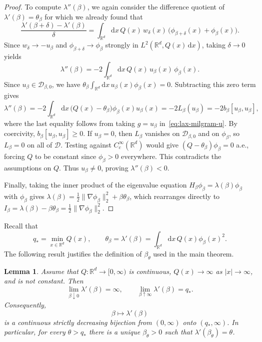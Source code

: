 \documentclass[11pt,reqno]{amsart}
\newtheorem{lemma}[theorem]{Lemma}
\theoremstyle{definition}
\numberwithin{equation}{section}
\newcommand{\<}{\langle}
\renewcommand{\>}{\rangle}
\def\de{{\rm d}}
\def\de{{\mathrm {d}}}
\begin{document}
\begin{appendix}
\begin{proof}
To compute $\lambda''(\beta)$, we again consider the difference quotient of $\lambda'(\beta) = \theta_{\beta}$ for which we already found that
\[
\frac{\lambda'(\beta+\delta) - \lambda'(\beta)}{\delta} = \int_{\mathbb{R}^d} \de x \, Q(x) \, w_{\delta}(x) \, \big(\phi_{\beta+\delta}(x) + \phi_{\beta}(x) \big).
\]
Since $w_{\delta} \to -u_{\beta}$ and $\phi_{\beta+\delta} \to \phi_{\beta}$ strongly in $L^2(\mathbb{R}^d,Q(x)\,\de x)$, taking $\delta \to 0$ yields
\[
\lambda''(\beta) = -2 \int_{\mathbb{R}^d} \de x \, Q(x) \, u_{\beta}(x) \, \phi_{\beta}(x) .
\]
Since $u_{\beta} \in \mathcal{D}_{\beta,0}$, we have $\theta_{\beta} \int_{\mathbb{R}^d} \de x \, u_{\beta}(x)\phi_{\beta}(x) = 0$. Subtracting this zero term gives
\[
\lambda''(\beta) = -2 \int_{\mathbb{R}^d} \de x \, \big(Q(x) - \theta_{\beta}\big)\phi_{\beta}(x) u_{\beta}(x)  = -2 L_{\beta}(u_{\beta}) = -2 b_{\beta}[u_{\beta}, u_{\beta}],
\]
where the last equality follows from taking $g = u_{\beta}$ in~\eqref{eq:lax-milgram-u}.
By coercivity, $b_{\beta}[u_{\beta}, u_{\beta}] \ge 0$. If $u_{\beta} = 0$, then $L_{\beta}$ vanishes on $\mathcal{D}_{\beta,0}$ and on $\phi_{\beta}$, so $L_{\beta} = 0$ on all of $\mathcal{D}$. Testing against $C_c^\infty(\mathbb{R}^d)$ would give $(Q - \theta_{\beta})\phi_{\beta} = 0$ a.e., forcing $Q$ to be constant since $\phi_{\beta} > 0$ everywhere. This contradicts the assumptions on $Q$. Thus $u_{\beta} \neq 0$, proving $\lambda''(\beta) < 0$.

Finally, taking the inner product of the eigenvalue equation $H_\beta \phi_\beta = \lambda(\beta)\phi_\beta$ with $\phi_\beta$ gives $\lambda(\beta) = \frac{1}{2}\|\nabla\phi_\beta\|_2^2 + \beta \theta_\beta$, which rearranges directly to $I_\beta = \lambda(\beta) - \beta \theta_\beta = \frac{1}{2}\|\nabla\phi_\beta\|_2^2$.
\end{proof}


Recall that
\[
    q_*=\min_{x\in\mathbb R^d}Q(x),
    \qquad
    \theta_\beta=\lambda'(\beta)
      =\int_{\mathbb R^d} \mathrm dx \, Q(x)\phi_\beta(x)^2.
\]
The following result justifies the definition of $\beta_\theta$ used in the
main theorem.

\begin{lemma}
\label{lem:range-constraint-coupling}
Assume that $Q\colon\mathbb R^d\to[0,\infty)$ is continuous,
$Q(x)\to\infty$ as $|x|\to\infty$, and is not constant.  Then
\[
    \lim_{\beta\downarrow0}\lambda'(\beta)=\infty,
    \qquad
    \lim_{\beta\uparrow\infty}\lambda'(\beta)=q_*.
\]
Consequently,
\[
    \beta\longmapsto\lambda'(\beta)
\]
is a continuous strictly decreasing bijection from $(0,\infty)$ onto
$(q_*,\infty)$.  In particular, for every $\theta>q_*$ there is a unique
$\beta_\theta>0$ such that $\lambda'(\beta_\theta)=\theta$.
\end{lemma}


\end{appendix}
\end{document}
